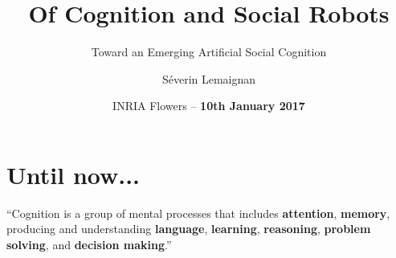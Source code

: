 \documentclass[compress]{beamer}
\title{Of Cognition and Social Robots}
\subtitle{Toward an Emerging Artificial Social Cognition}
\date{INRIA Flowers -- {\bf 10th January 2017}}
\author{Séverin Lemaignan}
\institute{Centre for Robotics and Neural Systems\\{\bf
Plymouth University}}
\begin{document}
\maketitle




\part{Until now...}

\begin{frame}[plain]{}

        \LARGE

        ``Cognition is a group of mental processes that includes {\bf
        attention}, {\bf memory}, producing and understanding {\bf
        language}, {\bf learning}, {\bf reasoning}, {\bf problem
        solving}, and {\bf decision making}.''

\end{frame}
\end{document}
